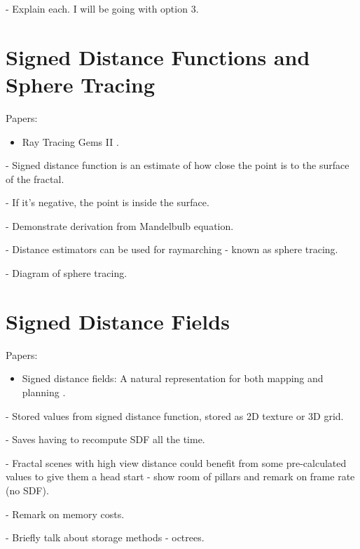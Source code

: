 - Explain each. I will be going with option 3.

\section{Signed Distance Functions and Sphere Tracing}

Papers:
\begin{itemize}
	\item Ray Tracing Gems II \cite{marrs2021ray}.
\end{itemize}

- Signed distance function is an estimate of how close the point is to the surface of the fractal.

-  If it's negative, the point is inside the surface.

- Demonstrate derivation from Mandelbulb equation.

- Distance estimators can be used for raymarching - known as sphere tracing.

- Diagram of sphere tracing.

\section{Signed Distance Fields}

Papers:
\begin{itemize}
	\item Signed distance fields: A natural representation for both mapping and planning \cite{oleynikova2016signed}.
\end{itemize}

- Stored values from signed distance function, stored as 2D texture or 3D grid.

- Saves having to recompute SDF all the time.

- Fractal scenes with high view distance could benefit from some pre-calculated values to give them a head start - show room of pillars and remark on frame rate (no SDF).

- Remark on memory costs.

- Briefly talk about storage methods - octrees.